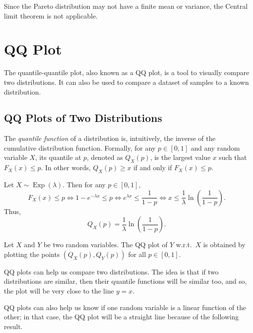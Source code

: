 \documentclass[12pt]{article}
\DeclareMathOperator{\Exp}{Exp}
\begin{document}
Since the Pareto distribution may not have a finite mean or variance,
the Central limit theorem is not applicable.

\section{QQ Plot}

The quantile-quantile plot, also known as a QQ plot, is a tool to visually compare two distributions.
It can also be used to compare a dataset of samples to a known distribution.

\subsection{QQ Plots of Two Distributions}

\begin{tcolorbox}[myres]
\begin{definition}
\label{defn:quantile}
The \emph{quantile function} of a distribution is, intuitively,
the inverse of the cumulative distribution function.
Formally, for any $p \in [0, 1]$ and any random variable $X$, its quantile at $p$,
denoted as $Q_X(p)$, is the largest value $x$ such that $F_X(x) \le p$.
In other words, $Q_X(p) \ge x$ if and only if $F_X(x) \le p$.
\end{definition}
\end{tcolorbox}

\begin{tcolorbox}[myres]
\begin{example}
Let $X \sim \Exp(\lambda)$. Then for any $p \in [0, 1]$,
\[ F_X(x) \le p
\iff 1 - e^{-\lambda x} \le p
\iff e^{\lambda x} \le \frac{1}{1-p}
\iff x \le \frac{1}{\lambda}\ln\left(\frac{1}{1-p}\right). \]
Thus,
\[ Q_X(p) = \frac{1}{\lambda}\ln\left(\frac{1}{1-p}\right). \]
\end{example}
\end{tcolorbox}

Let $X$ and $Y$ be two random variables.
The QQ plot of $Y$ w.r.t.~$X$ is obtained by plotting the points
$(Q_X(p), Q_Y(p))$ for all $p \in [0, 1]$.

QQ plots can help us compare two distributions.
The idea is that if two distributions are similar,
then their quantile functions will be similar too,
and so, the plot will be very close to the line $y = x$.

QQ plots can also help us know if one random variable is a linear function of the other;
in that case, the QQ plot will be a straight line because of the following result.
\end{document}
